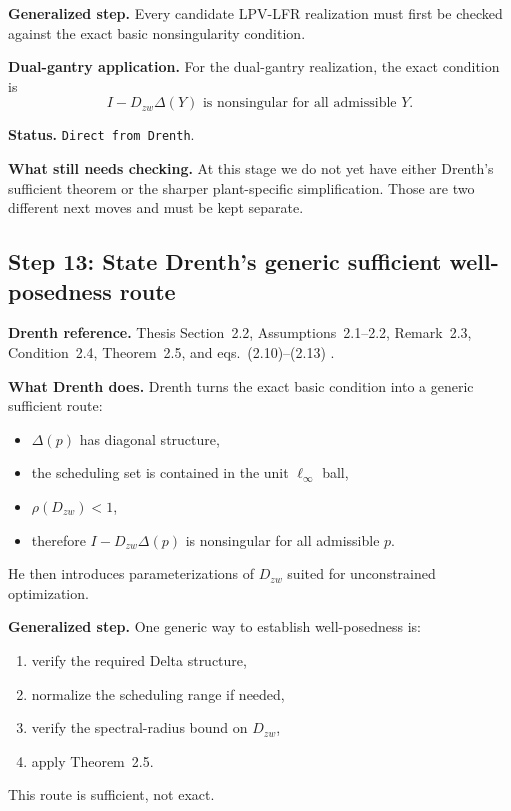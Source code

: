 \documentclass[11pt]{article}
\newcommand{\audititem}[2]{\par\smallskip\noindent\textbf{#1.} #2\par}
\newcommand{\statusline}[1]{\texttt{#1}}
\begin{document}
\audititem{Generalized step}{Every candidate LPV-LFR realization must first be
checked against the exact basic nonsingularity condition.}

\audititem{Dual-gantry application}{For the dual-gantry realization, the exact
condition is
\begin{equation}
    I - D_{zw}\Delta(Y) \text{ is nonsingular for all admissible } Y.
    \label{eqv:wpbasic}
\end{equation}}

\audititem{Status}{\statusline{Direct from Drenth}.}

\audititem{What still needs checking}{At this stage we do not yet have either
Drenth's sufficient theorem or the sharper plant-specific simplification. Those
are two different next moves and must be kept separate.}

\subsection{Step 13: State Drenth's generic sufficient well-posedness route}

\audititem{Drenth reference}{Thesis Section~2.2, Assumptions~2.1--2.2,
Remark~2.3, Condition~2.4, Theorem~2.5, and eqs.~(2.10)--(2.13)
\cite{drenth2025thesis}.}

\audititem{What Drenth does}{Drenth turns the exact basic condition into a
generic sufficient route:
\begin{itemize}[leftmargin=1.2em]
    \item $\Delta(p)$ has diagonal structure,
    \item the scheduling set is contained in the unit $\ell_\infty$ ball,
    \item $\rho(D_{zw}) < 1$,
    \item therefore $I - D_{zw}\Delta(p)$ is nonsingular for all admissible $p$.
\end{itemize}
He then introduces parameterizations of $D_{zw}$ suited for unconstrained
optimization.}

\audititem{Generalized step}{One generic way to establish well-posedness is:
\begin{enumerate}[leftmargin=1.4em,label=\arabic*.]
    \item verify the required Delta structure,
    \item normalize the scheduling range if needed,
    \item verify the spectral-radius bound on $D_{zw}$,
    \item apply Theorem~2.5.
\end{enumerate}
This route is sufficient, not exact.}
\end{document}
